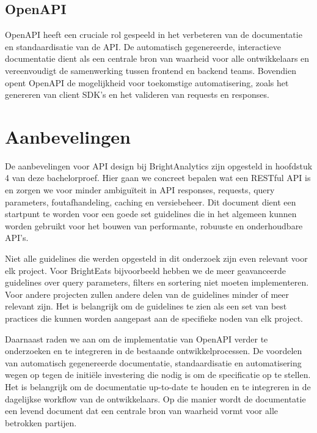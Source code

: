 \subsection{OpenAPI}

OpenAPI heeft een cruciale rol gespeeld in het verbeteren van de documentatie en standaardisatie van de API. De automatisch gegenereerde, interactieve documentatie dient als een centrale bron van waarheid voor alle ontwikkelaars en vereenvoudigt de samenwerking tussen frontend en backend teams. Bovendien opent OpenAPI de mogelijkheid voor toekomstige automatisering, zoals het genereren van client SDK's en het valideren van requests en responses.

\section{Aanbevelingen}

De aanbevelingen voor API design bij BrightAnalytics zijn opgesteld in hoofdstuk 4 van deze bachelorproef. Hier gaan we concreet bepalen wat een RESTful API is en zorgen we voor minder ambigu\"iteit in API responses, requests, query parameters, foutafhandeling, caching en versiebeheer. Dit document dient een startpunt te worden voor een goede set guidelines die in het algemeen kunnen worden gebruikt voor het bouwen van performante, robuuste en onderhoudbare API's.

\bigskip

Niet alle guidelines die werden opgesteld in dit onderzoek zijn even relevant voor elk project. Voor Bright\-Eats bijvoorbeeld hebben we de meer geavanceerde guidelines over query parameters, filters en sortering niet moeten implementeren. Voor andere projecten zullen andere delen van de guidelines minder of meer relevant zijn. Het is belangrijk om de guidelines te zien als een set van best practices die kunnen worden aangepast aan de specifieke noden van elk project.

\bigskip

Daarnaast raden we aan om de implementatie van OpenAPI verder te onderzoeken en te integreren in de bestaande ontwikkelprocessen. De voordelen van automatisch gegenereerde documentatie, standaardisatie en automatisering wegen op tegen de initi\"ele investering die nodig is om de specificatie op te stellen. Het is belangrijk om de documentatie up-to-date te houden en te integreren in de dagelijkse workflow van de ontwikkelaars. Op die manier wordt de documentatie een levend document dat een centrale bron van waarheid vormt voor alle betrokken partijen.

